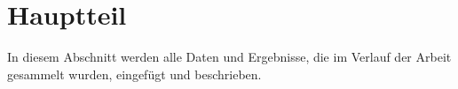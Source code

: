 \chapter{Hauptteil}
\label{cha:hauptteil}

In diesem Abschnitt werden alle Daten und Ergebnisse, die im Verlauf der Arbeit gesammelt wurden, eingef\"ugt und beschrieben.
